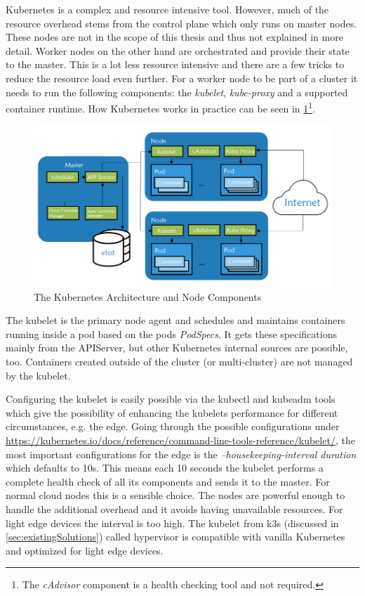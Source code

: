 Kubernetes is a complex and resource intensive tool. However, much of the resource overhead stems from the control plane which only runs on master nodes. These nodes are not in the scope of this thesis and thus not explained in more detail. Worker nodes on the other hand are orchestrated and provide their state to the master. This is a lot less resource intensive and there are a few tricks to reduce the resource load even further. For a worker node to be part of a cluster it needs to run the following components: the \textit{kubelet}, \textit{kube-proxy} and a supported container runtime. How Kubernetes works in practice can be seen in \cref{fig:nodeComponents}\footnote{The \textit{cAdvisor} component is a health checking tool and not required.}.
\begin{figure}[h!]
    \centering
    \includegraphics[scale=0.6]{figures/rancherK8sComponents.png}
    \caption{The Kubernetes Architecture and Node Components\cite{nodeSetupKubernetes:online}}
    \label{fig:nodeComponents}
\end{figure}
The kubelet is the primary node agent and schedules and maintains containers running inside a pod based on the pods \textit{PodSpecs}. It gets these specifications mainly from the APIServer, but other Kubernetes internal sources are possible, too. Containers created outside of the cluster (or multi-cluster) are not managed by the kubelet. 

Configuring the kubelet is easily possible via the kubectl and kubeadm tools which give the possibility of enhancing the kubelets performance for different circumstances, e.g. the edge. Going through the possible configurations under \url{https://kubernetes.io/docs/reference/command-line-tools-reference/kubelet/}, the most important configurations for the edge is the \textit{--housekeeping-interval duration} which defaults to 10s\cite{rancherKubernetesComponents:online}. This means each 10 seconds the kubelet performs a complete health check of all its components and sends it to the master. For normal cloud nodes this is a sensible choice. The nodes are powerful enough to handle the additional overhead and it avoids having unavailable resources. For light edge devices the interval is too high. The kubelet from k3s (discussed in \cref{sec:existingSolutions}) called hypervisor is compatible with vanilla Kubernetes and optimized for light edge devices.

